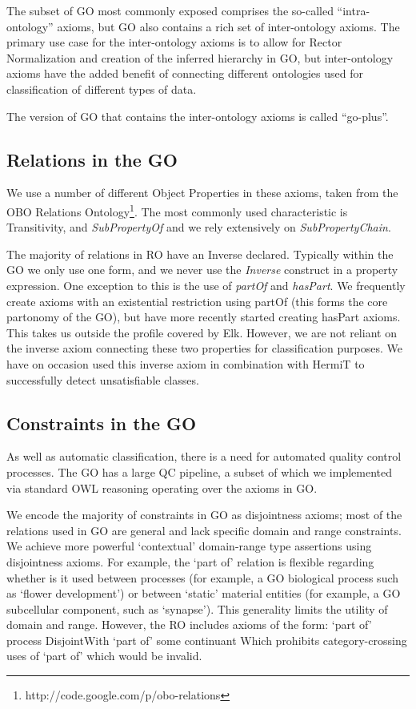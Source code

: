 \documentclass{llncs}
\begin{document}
The subset of GO most commonly exposed comprises the so-called
``intra-ontology'' axioms, but GO also contains a rich set of
inter-ontology axioms. The primary use case for the inter-ontology
axioms is to allow for Rector Normalization and creation of the
inferred hierarchy in GO, but inter-ontology axioms have the added
benefit of connecting different ontologies used for classification of
different types of data.

The version of GO that contains the inter-ontology axioms is called
``go-plus''.

\subsection{Relations in the GO}

We use a number of different Object Properties in these axioms, taken
from the OBO Relations
Ontology\footnote{http://code.google.com/p/obo-relations}. The most
commonly used characteristic is Transitivity, and \emph{SubPropertyOf}
and we rely extensively on \emph{SubPropertyChain}.

The majority of relations in RO have an Inverse declared. Typically
within the GO we only use one form, and we never use the
\emph{Inverse} construct in a property expression. One exception to
this is the use of \emph{partOf} and \emph{hasPart}. We frequently
create axioms with an existential restriction using partOf (this forms
the core partonomy of the GO), but have more recently started creating
hasPart axioms\cite{berardini2010gene}. This takes us outside the
profile covered by Elk. However, we are not reliant on the inverse
axiom connecting these two properties for classification purposes. We
have on occasion used this inverse axiom in combination with HermiT to
successfully detect unsatisfiable classes.

\subsection{Constraints in the GO}

As well as automatic classification, there is a need for automated
quality control processes. The GO has a large QC pipeline, a subset of
which we implemented via standard OWL reasoning operating over the
axioms in GO.

We encode the majority of constraints in GO as disjointness axioms;
most of the relations used in GO are general and lack specific domain
and range constraints. We achieve more powerful ‘contextual’
domain-range type assertions using disjointness axioms. For example,
the `part of' relation is flexible regarding whether is it used
between processes (for example, a GO biological process such as
‘flower development’) or between ‘static’ material entities (for
example, a GO subcellular component, such as ‘synapse’). This
generality limits the utility of domain and range. However, the RO
includes axioms of the form: `part of' process DisjointWith `part of' %
some continuant Which prohibits category-crossing uses of `part of'
which would be invalid.
\end{document}
